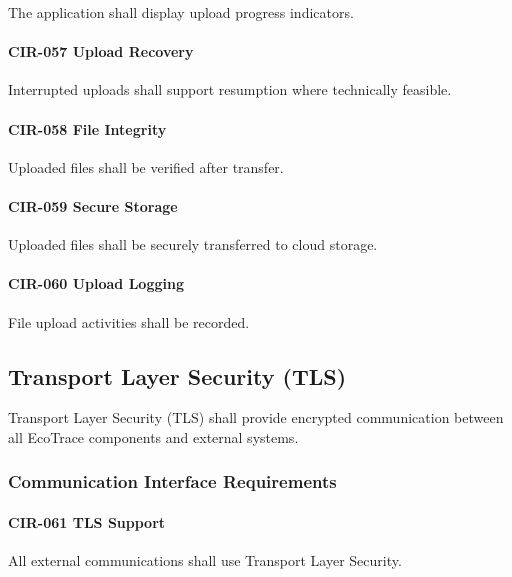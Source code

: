 The application shall display upload progress indicators.

\paragraph{CIR-057 Upload Recovery}

Interrupted uploads shall support resumption where technically feasible.

\paragraph{CIR-058 File Integrity}

Uploaded files shall be verified after transfer.

\paragraph{CIR-059 Secure Storage}

Uploaded files shall be securely transferred to cloud storage.

\paragraph{CIR-060 Upload Logging}

File upload activities shall be recorded.


\subsection{Transport Layer Security (TLS)}

Transport Layer Security (TLS) shall provide encrypted communication
between all EcoTrace components and external systems.


\subsubsection*{Communication Interface Requirements}

\paragraph{CIR-061 TLS Support}

All external communications shall use Transport Layer Security.


